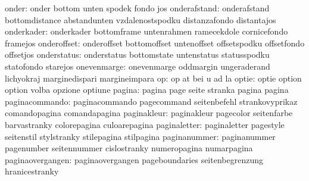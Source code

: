                     onder: onder                     bottom
                           unten                     spodek
                           fondo                     jos
             onderafstand: onderafstand              bottomdistance
                           abstandunten              vzdalenostspodku
                           distanzafondo             distantajos
               onderkader: onderkader                bottomframe
                           untenrahmen               ramecekdole
                           cornicefondo              framejos
              onderoffset: onderoffset               bottomoffset
                           untenoffset               offsetspodku
                           offsetfondo               offsetjos
              onderstatus: onderstatus               bottomstate
                           untenstatus               statusspodku
                           statofondo                starejos
              onevenmarge: onevenmarge               oddmargin
                           ungeraderand              lichyokraj
                           marginedispari            margineimpara
                       op: op                        at
                           bei                       u
                           ad                        la
                    optie: optie                     option
                           option                    volba
                           opzione                   optiune
                   pagina: pagina                    page
                           seite                     stranka
                           pagina                    pagina
           paginacommando: paginacommando            pagecommand
                           seitenbefehl              strankovyprikaz
                           comandopagina             comandapagina
              paginakleur: paginakleur               pagecolor
                           seitenfarbe               barvastranky
                           colorepagina              culoarepagina
             paginaletter: paginaletter              pagestyle
                           seitenstil                stylstranky
                           stilepagina               stilpagina
             paginanummer: paginanummer              pagenumber
                           seitennummer              cislostranky
                           numeropagina              numarpagina
         paginaovergangen: paginaovergangen          pageboundaries
                           seitenbegrenzung          hranicestranky
